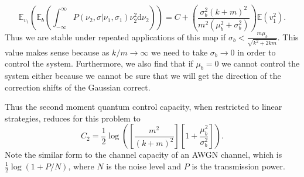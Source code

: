 \documentclass[superscriptaddress,aps,pra,nofootinbib,onecolumn,notitlepage,10pt]{revtex4-1}
\begin{document}
\begin{equation}
\mathbb{E}_{v_1} \left(\mathbb{E}_{b}\left(\int_{-\infty}^\infty P(\nu_2,\sigma|\nu_1,\sigma_1) \nu_2^2\mathrm{d}\nu_2\right)\right) = C + \left(\frac{\sigma_b^2(k+m)^2}{m^2(\mu_b^2+\sigma_b^2)}\right)\mathbb{E}(v_1^2).
\end{equation}
Thus we are stable under repeated applications of this map if $\sigma_b < \frac{m\mu_b}{\sqrt{k^2 +2km}}$.  This value makes sense because as $k/m\rightarrow \infty$ we need to take $\sigma_b \rightarrow 0$ in order to control the system.  Furthermore, we also find that if $\mu_b=0$ we cannot control the system either because we cannot be sure that we will get the direction of the correction shifts of the Gaussian correct.

Thus the second moment quantum control capacity, when restricted to linear strategies, reduces for this problem to
\begin{equation}
C_2 = \frac{1}{2}\log \left(\left[\frac{m^2}{(k+m)^2}\right]\left[1+\frac{\mu_b^2}{\sigma_b^2} \right]\right).
\end{equation}
Note the similar form to the channel capacity of an AWGN channel, which is $\frac{1}{2} \log(1+P/N)$, where $N$ is the noise level and $P$ is the transmission power.
\end{document}
